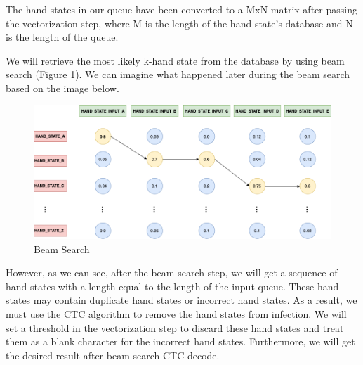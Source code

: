 The hand states in our queue have been converted to a MxN matrix after passing the vectorization step, where M is the length of the hand state's database and N is the length of the queue.

We will retrieve the most likely k-hand state from the database by using beam search (Figure \ref{fig:Chap4-BeamSearch}). We can imagine what happened later during the beam search based on the image below.

      


\begin{figure}[H]
  \centering
  \includegraphics[width=\textwidth]{img/Chap4/BeamSearch.png}
  \caption{ Beam Search }
  \label{fig:Chap4-BeamSearch}
\end{figure}

However, as we can see, after the beam search step, we will get a sequence of hand states with a length equal to the length of the input queue. These hand states may contain duplicate hand states or incorrect hand states. As a result, we must use the CTC algorithm to remove the hand states from infection. We will set a threshold in the vectorization step to discard these hand states and treat them as a blank character for the incorrect hand states. Furthermore, we will get the desired result after beam search CTC decode.



